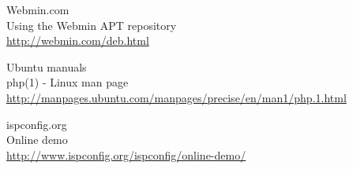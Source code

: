 \begin{thebibliography}{10}
Webmin.com\\
Using the Webmin APT repository\\
  \url{http://webmin.com/deb.html}

Ubuntu manuals\\
php(1) - Linux man page\\
  \url{http://manpages.ubuntu.com/manpages/precise/en/man1/php.1.html}

ispconfig.org\\
Online demo\\
  \url{http://www.ispconfig.org/ispconfig/online-demo/}

\end{thebibliography}
